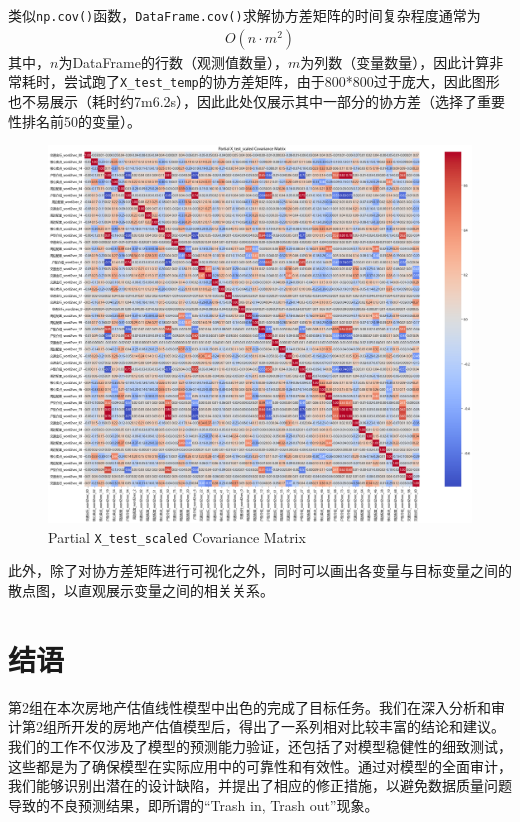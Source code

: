 \documentclass[
    report,     %
    oneside,    %
    UTF8,       %
    zihao=-4    %
]{config} %
\begin{document}
类似\lstinline|np.cov()|函数，\lstinline|DataFrame.cov()|求解协方差矩阵的时间复杂程度通常为
\begin{align}
    O(n \cdot m^2)
\end{align}
其中，$n$为DataFrame的行数（观测值数量），$m$为列数（变量数量），因此计算非常耗时，尝试跑了\lstinline|X_test_temp|的协方差矩阵，由于800*800过于庞大，因此图形也不易展示（耗时约7m6.2s），因此此处仅展示其中一部分的协方差（选择了重要性排名前50的变量）。

\begin{figure}[H]
    \centering
    \includegraphics[width=\textwidth]{figures/partial cov martrix test.png}
    \caption{Partial \lstinline|X_test_scaled| Covariance Matrix}
    \label{fig:cov_matrix_plt}
\end{figure}

此外，除了对协方差矩阵进行可视化之外，同时可以画出各变量与目标变量之间的散点图，以直观展示变量之间的相关关系。

\chapter{结语}

第2组在本次房地产估值线性模型中出色的完成了目标任务。我们在深入分析和审计第2组所开发的房地产估值模型后，得出了一系列相对比较丰富的结论和建议。我们的工作不仅涉及了模型的预测能力验证，还包括了对模型稳健性的细致测试，这些都是为了确保模型在实际应用中的可靠性和有效性。通过对模型的全面审计，我们能够识别出潜在的设计缺陷，并提出了相应的修正措施，以避免数据质量问题导致的不良预测结果，即所谓的“Trash in, Trash out”现象。
\end{document}
